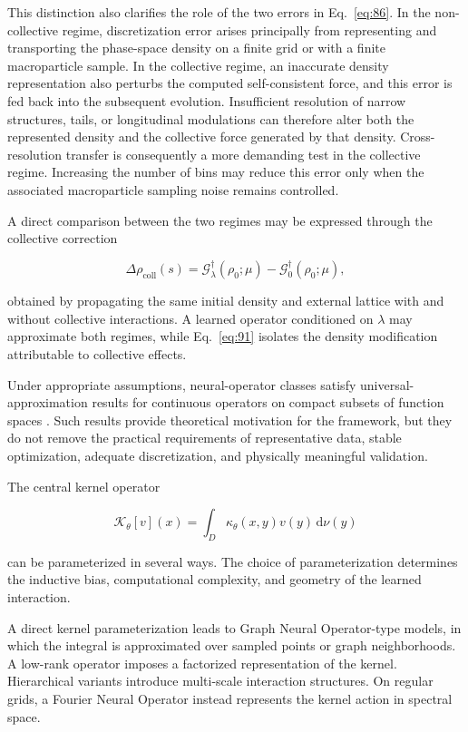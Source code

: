 This distinction also clarifies the role of the two errors in Eq.~\eqref{eq:86}. In the non-collective regime, discretization error arises principally from representing and transporting the phase-space density on a finite grid or with a finite macroparticle sample. In the collective regime, an inaccurate density representation also perturbs the computed self-consistent force, and this error is fed back into the subsequent evolution. Insufficient resolution of narrow structures, tails, or longitudinal modulations can therefore alter both the represented density and the collective force generated by that density. Cross-resolution transfer is consequently a more demanding test in the collective regime. Increasing the number of bins may reduce this error only when the associated macroparticle sampling noise remains controlled.

A direct comparison between the two regimes may be expressed through the collective correction

\begin{equation}
\label{eq:91}
\Delta\rho_{\mathrm{coll}}(s)=\mathcal G_{\lambda}^{\dagger}(\rho_0;\mu)-\mathcal G_0^{\dagger}(\rho_0;\mu),
\end{equation}

obtained by propagating the same initial density and external lattice with and without collective interactions. A learned operator conditioned on \(\lambda\) may approximate both regimes, while Eq.~\eqref{eq:91} isolates the density modification attributable to collective effects.

Under appropriate assumptions, neural-operator classes satisfy universal-approximation results for continuous operators on compact subsets of function spaces \cite{kovachki2023operators}. Such results provide theoretical motivation for the framework, but they do not remove the practical requirements of representative data, stable optimization, adequate discretization, and physically meaningful validation.

The central kernel operator

\begin{equation}
\label{eq:92}
\mathcal K_{\theta}[v](x)=\int_D\kappa_{\theta}(x,y)v(y)\,\mathrm d\nu(y)
\end{equation}

can be parameterized in several ways. The choice of parameterization determines the inductive bias, computational complexity, and geometry of the learned interaction.

A direct kernel parameterization leads to Graph Neural Operator-type models, in which the integral is approximated over sampled points or graph neighborhoods. A low-rank operator imposes a factorized representation of the kernel. Hierarchical variants introduce multi-scale interaction structures. On regular grids, a Fourier Neural Operator instead represents the kernel action in spectral space.

